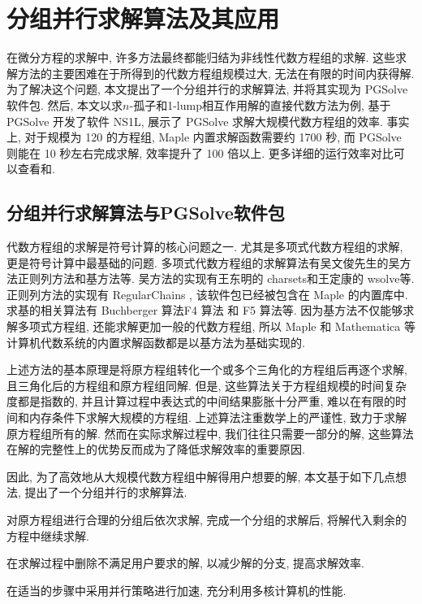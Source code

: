 \chapter{分组并行求解算法及其应用}\label{ch03}
在微分方程的求解中, 许多方法最终都能归结为非线性代数方程组的求解. 这些求解方法的主要困难在于所得到的代数方程组规模过大, 无法在有限的时间内获得解. 为了解决这个问题, 本文提出了一个分组并行的求解算法, 并将其实现为 PGSolve 软件包. 然后, 本文以求$n$-孤子和1-lump相互作用解的直接代数方法为例, 基于 PGSolve 开发了软件 NS1L, 展示了 PGSolve 求解大规模代数方程组的效率. 事实上, 对于规模为 120 的方程组, Maple 内置求解函数需要约 1700 秒, 而 PGSolve 则能在 10 秒左右完成求解, 效率提升了 100 倍以上. 更多详细的运行效率对比可以查看和. 

\section{分组并行求解算法与PGSolve软件包}
代数方程组的求解是符号计算的核心问题之一. 尤其是多项式代数方程组的求解, 更是符号计算中最基础的问题. 多项式代数方程组的求解算法有吴文俊先生的吴方法\cite{wu1984,wu1985}\D 正则列方法\cite{kalkbrener1991three,lu1994searching}和\Grobner{}基方法\cite{adams1994introduction}等. 吴方法的实现有王东明的 charsets\cite{wang1995implementation}和王定康的 wsolve\cite{wsolve}等. 正则列方法的实现有 RegularChains \cite{maza2000triangular}, 该软件包已经被包含在 Maple 的内置库中. 求\Grobner{}基的相关算法有 Buchberger 算法\cite{buchberger1970algorithmic}\D F4 算法\cite{faugere1999new} 和 F5 算法\cite{faugere2002new}等. 因为\Grobner{}基方法不仅能够求解多项式方程组, 还能求解更加一般的代数方程组, 所以 Maple 和 Mathematica 等计算机代数系统的内置求解函数都是以\Grobner{}基方法为基础实现的.

上述方法的基本原理是将原方程组转化一个或多个三角化的方程组后再逐个求解, 且三角化后的方程组和原方程组同解. 但是, 这些算法关于方程组规模的时间复杂度都是指数的, 并且计算过程中表达式的中间结果膨胀十分严重, 难以在有限的时间和内存条件下求解大规模的方程组. 上述算法注重数学上的严谨性, 致力于求解原方程组所有的解. 然而在实际求解过程中, 我们往往只需要一部分的解, 这些算法在解的完整性上的优势反而成为了降低求解效率的重要原因. 

因此, 为了高效地从大规模代数方程组中解得用户想要的解, 本文基于如下几点想法, 提出了一个分组并行的求解算法.
\begin{compactenum}[(1)]
\item 对原方程组进行合理的分组后依次求解, 完成一个分组的求解后, 将解代入剩余的方程中继续求解. 
\item 在求解过程中删除不满足用户要求的解, 以减少解的分支, 提高求解效率.
\item 在适当的步骤中采用并行策略进行加速, 充分利用多核计算机的性能.
\end{compactenum}

